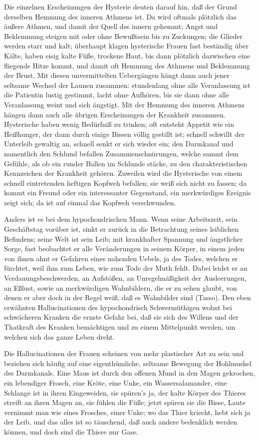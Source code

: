 Die einzelnen Erscheinungen der Hysterie deuten darauf hin, daß der Grund derselben Hemmung des inneren Athmens ist. Da wird oftmals plötzlich das äußere Athmen, und damit der Quell des innern gehemmt; Angst und Beklemmung steigen mit oder ohne Bewußtsein bis zu Zuckungen; die Glieder werden starr und kalt; überhaupt klagen hysterische Frauen fast beständig über Kälte, haben eisig kalte Füße, trockene Haut, bis dann plötzlich dazwischen eine fliegende Hitze kommt, und damit oft Hemmung des Athmens und Beklemmung der Brust. Mit diesen unvermittelten Uebergängen hängt dann auch jener seltsame Wechsel der Launen zusammen: stundenlang ohne alle Veranlassung ist die Patientin lustig gestimmt, lacht ohne Aufhören, bis sie dann ohne alle Veranlassung weint und sich ängstigt. Mit der Hemmung des inneren Athmens hängen dann auch alle übrigen Erscheinungen der Krankheit zusammen. Hysterische haben wenig Bedürfniß zu trinken; oft entsteht Appetit wie ein Heißhunger, der dann durch einige Bissen völlig gestillt ist; schnell schwillt der Unterleib gewaltig an, schnell senkt er sich wieder ein; den Darmkanal und namentlich den Schlund befallen Zusammenschnürungen, welche sammt dem Gefühle, als ob ein runder Ballen im Schlunde stäcke, zu den charakteristischen Kennzeichen der Krankheit gehören. Zuweilen wird die Hysterische von einem schnell eintretenden heftigen Kopfweh
befallen; sie weiß sich nicht zu fassen; da kommt ein Freund oder ein interessanter Gegenstand, ein merkwürdiges Ereignis zeigt sich; da ist auf einmal das Kopfweh verschwunden.

Anders ist es bei dem hypochondrischen Mann. Wenn seine Arbeitszeit, sein Geschäftstag vorüber ist, sinkt er zurück in die Betrachtung seines leiblichen Befindens; seine Welt ist sein Leib; mit krankhafter Spannung und ängstlicher Sorge, fast beobachtet er alle Veränderungen in seinem Körper, in einem jeden von ihnen ahnt er Gefahren eines nahenden Uebels, ja des Todes, welchen er fürchtet, weil ihm zum Leben, wie zum Tode der Muth fehlt. Dabei leidet er an Verdauungsbeschwerden, an Aufstößen, an Unregelmäßigkeit der Ausleerungen, an Eßlust, sowie an merkwürdigen Wahnbildern, die er zu sehen glaubt, von denen er aber doch in der Regel weiß, daß es Wahnbilder sind (Tasso). Den eben erwähnten Hallucinationen des hypochondrisch Schwermüthigen wohnt bei schwächeren Kranken die ernste Gefahr bei, daß sie sich des Willens und der Thatkraft des Kranken bemächtigen und zu einem Mittelpunkt werden, um welchen sich das ganze Leben dreht.

Die Hallucinationen der Frauen scheinen von mehr plastischer Art zu sein und beziehen sich häufig auf eine eigenthümliche, seltsame Bewegung der Hohlmuskel des Darmkanals. Eine Maus ist durch den offenen Mund in den Magen gekrochen, ein lebendiger Frosch, eine Kröte, eine Unke, ein Wassersalamander, eine Schlange ist in ihren Eingeweiden, sie spüren’s ja, der kalte Körper des Thieres streift an ihren Magen an, sie fühlen die Füße; jetzt spüren sie die
Bisse, Laute vernimmt man wie eines Frosches, einer Unke; wo das Thier kriecht, hebt sich ja der Leib, und das alles ist so täuschend, daß auch andere bedenklich werden können, und doch sind die Thiere nur Gase.

